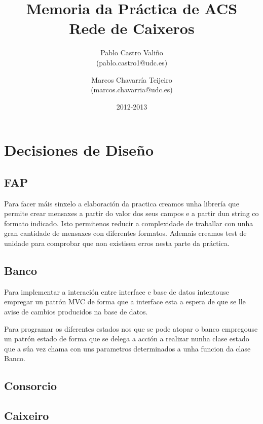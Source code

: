 \documentclass[a4paper,titlepage]{article}
\begin{document}
\title{\Huge{Memoria da Práctica de ACS} \\ \small{Rede de Caixeros}}
\author{Pablo Castro Valiño \\ \small{(pablo.castro1@udc.es)} \and
Marcos Chavarría Teijeiro \\ \small{(marcos.chavarria@udc.es)}}
\date{2012-2013}
\maketitle

\tableofcontents

\newpage

\section{Decisiones de Diseño}
\subsection {FAP}
Para facer máis sinxelo a elaboración da practica creamos unha librería que permite crear mensaxes a partir do valor dos seus campos e a partir dun string co formato indicado. Isto permitenos reducir a complexidade de traballar con unha gran cantidade de mensaxes con diferentes formatos. Ademais creamos test de unidade para comprobar que non existisen erros nesta parte da práctica.

\subsection {Banco}
Para implementar a interación entre interface e base de datos intentouse empregar un patrón MVC de forma que a interface esta a espera de que se lle avise de cambios producidos na base de datos.

Para programar os diferentes estados nos que se pode atopar o banco empregouse un patrón estado de forma que se delega a acción a realizar nunha clase estado que a súa vez chama con uns parametros determinados a unha funcion da clase Banco.

\subsection {Consorcio}
\subsection {Caixeiro}
\newpage

\clearpage
\newpage
\end{document}
